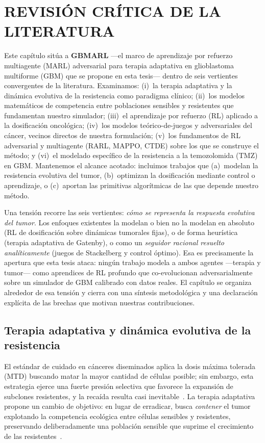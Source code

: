 \chapter{REVISIÓN CRÍTICA DE LA LITERATURA}
\label{cap:related-work}

Este capítulo sitúa a \textbf{GBMARL} ---el marco de aprendizaje por refuerzo multiagente (MARL) adversarial para terapia adaptativa en glioblastoma multiforme (GBM) que se propone en esta tesis--- dentro de seis vertientes convergentes de la literatura. Examinamos: (i)~la terapia adaptativa y la dinámica evolutiva de la resistencia como paradigma clínico; (ii)~los modelos matemáticos de competencia entre poblaciones sensibles y resistentes que fundamentan nuestro simulador; (iii)~el aprendizaje por refuerzo (RL) aplicado a la dosificación oncológica; (iv)~los modelos teórico-de-juegos y adversariales del cáncer, vecinos directos de nuestra formulación; (v)~los fundamentos de RL adversarial y multiagente (RARL, MAPPO, CTDE) sobre los que se construye el método; y (vi)~el modelado específico de la resistencia a la temozolomida (TMZ) en GBM. Mantenemos el alcance acotado: incluimos trabajos que (a)~modelan la resistencia evolutiva del tumor, (b)~optimizan la dosificación mediante control o aprendizaje, o (c)~aportan las primitivas algorítmicas de las que depende nuestro método.

Una tensión recorre las seis vertientes: \emph{cómo se representa la respuesta evolutiva del tumor}. Los enfoques existentes la modelan o bien no la modelan en absoluto (RL de dosificación sobre dinámicas tumorales fijas), o de forma heurística (terapia adaptativa de Gatenby), o como un \emph{seguidor racional resuelto analíticamente} (juegos de Stackelberg y control óptimo). Esa es precisamente la apertura que esta tesis ataca: ningún trabajo modela a ambos agentes ---terapia y tumor--- como aprendices de RL profundo que co-evolucionan adversarialmente sobre un simulador de GBM calibrado con datos reales. El capítulo se organiza alrededor de esa tensión y cierra con una síntesis metodológica y una declaración explícita de las brechas que motivan nuestras contribuciones.

\section{Terapia adaptativa y dinámica evolutiva de la resistencia}
\label{sec:terapia-adaptativa}

El estándar de cuidado en cánceres diseminados aplica la dosis máxima tolerada (MTD) buscando matar la mayor cantidad de células posible; sin embargo, esta estrategia ejerce una fuerte presión selectiva que favorece la expansión de subclones resistentes, y la recaída resulta casi inevitable~\cite{Gatenby2022}. La terapia adaptativa propone un cambio de objetivo: en lugar de erradicar, busca \emph{contener} el tumor explotando la competencia ecológica entre células sensibles y resistentes, preservando deliberadamente una población sensible que suprime el crecimiento de las resistentes~\cite{Gatenby2022,Zhang2023Review}.

